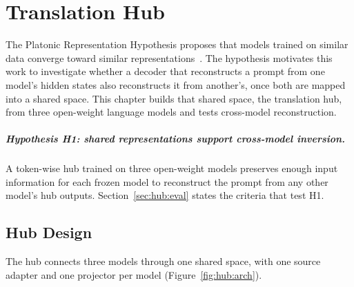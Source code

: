 
\providecommand{\vf}[1]{\textcolor{blue}{#1}}
\providecommand{\hit}[1]{\textcolor[RGB]{0,115,90}{#1}}
\providecommand{\miss}[1]{\textcolor[RGB]{196,78,0}{\textbf{#1}}}

\chapter{Translation Hub}\label{ch:hub}

The Platonic Representation Hypothesis proposes that models trained on similar data converge toward similar representations~\cite{huh2024platonic}.
The hypothesis motivates this work to investigate whether a decoder that reconstructs a prompt from one model's hidden states also reconstructs it from another's, once both are mapped into a shared space.
This chapter builds that shared space, the translation hub, from three open-weight language models and tests cross-model reconstruction.

\paragraph{Hypothesis H1: shared representations support cross-model inversion.} A token-wise hub trained on three open-weight models preserves enough input information for each frozen model to reconstruct the prompt from any other model's hub outputs.
Section~\ref{sec:hub:eval} states the criteria that test H1.

\section{Hub Design}\label{sec:hub:design}

The hub connects three models through one shared space, with one source adapter and one projector per model (Figure~\ref{fig:hub:arch}).

